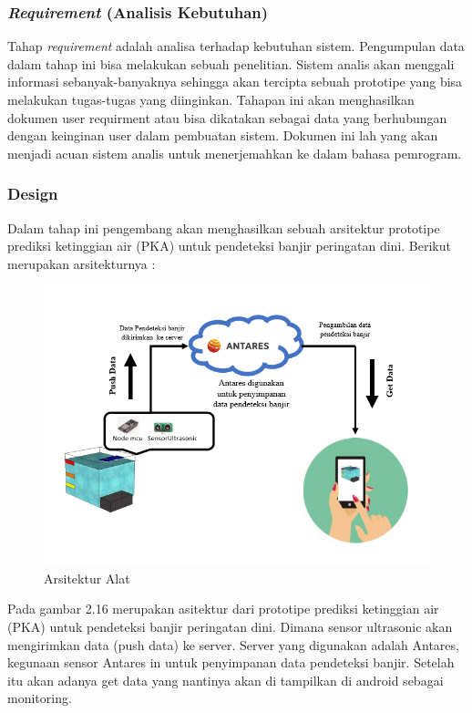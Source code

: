 \subsubsection{\textit{Requirement} (Analisis Kebutuhan)}
Tahap \textit{requirement}  adalah analisa terhadap kebutuhan sistem. Pengumpulan data dalam tahap ini bisa melakukan sebuah penelitian. Sistem analis akan menggali informasi sebanyak-banyaknya sehingga akan tercipta sebuah prototipe yang bisa melakukan tugas-tugas yang diinginkan. Tahapan ini akan menghasilkan dokumen user requirment atau bisa dikatakan sebagai data yang berhubungan dengan keinginan user dalam pembuatan sistem. Dokumen ini lah yang akan menjadi acuan sistem analis untuk menerjemahkan ke dalam bahasa pemrogram.
\subsubsection{Design}
Dalam tahap ini pengembang akan menghasilkan sebuah arsitektur prototipe prediksi ketinggian air (PKA) untuk pendeteksi banjir  peringatan  dini. Berikut merupakan arsitekturnya :
\begin{figure}[H]
\centering
\includegraphics[width=1\textwidth]{figures/arsitektur.png}
\caption{Arsitektur Alat}
\label{print}
\end{figure}

Pada gambar 2.16 merupakan asitektur dari prototipe prediksi ketinggian air (PKA) untuk pendeteksi banjir  peringatan  dini. Dimana sensor ultrasonic akan mengirimkan data (push data) ke server. Server yang digunakan adalah Antares, kegunaan sensor Antares in untuk penyimpanan data pendeteksi banjir. Setelah itu akan adanya get data  yang nantinya akan di tampilkan di android sebagai monitoring.

